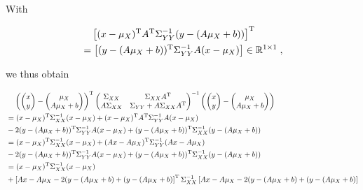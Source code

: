 \documentclass[a4paper,12pt]{article}
\begin{document}
With

\begin{equation} \label{eq:Sigma-yy-inv-equiv}
\begin{split}
&\hphantom{=}\; \left[ (x - \mu_X)^\mathrm{T} A^\mathrm{T} \Sigma_{YY}^{-1} (y - (A\mu_X + b)) \right]^\mathrm{T} \\
&= \left[ (y - (A\mu_X + b))^\mathrm{T} \Sigma_{YY}^{-1} A (x - \mu_X) \right] \in \mathbb{R}^{1 \times 1} \; ,
\end{split}
\end{equation}

we thus obtain

\begin{equation} \label{eq:mvn-joint-pdf-s3b}
\begin{split}
&\hphantom{=}\;
\left( \begin{pmatrix} x \\ y \end{pmatrix} - \begin{pmatrix} \mu_X \\ A\mu_X + b \end{pmatrix} \right)^\mathrm{T}
\begin{pmatrix}
\Sigma_{XX}   & \Sigma_{XX} A^\mathrm{T} \\
A \Sigma_{XX} & \Sigma_{YY} + A \Sigma_{XX} A^\mathrm{T}
\end{pmatrix}^{-1}
\left( \begin{pmatrix} x \\ y \end{pmatrix} - \begin{pmatrix} \mu_X \\ A\mu_X + b \end{pmatrix} \right) \\
&= (x - \mu_X)^\mathrm{T} \Sigma_{XX}^{-1} (x - \mu_X) + (x - \mu_X)^\mathrm{T} A^\mathrm{T} \Sigma_{YY}^{-1} A (x - \mu_X) \\
&- 2 (y - (A\mu_X + b))^\mathrm{T} \Sigma_{YY}^{-1} A (x - \mu_X) + (y - (A\mu_X + b))^\mathrm{T} \Sigma_{XX}^{-1} (y - (A\mu_X + b)) \\
&= (x - \mu_X)^\mathrm{T} \Sigma_{XX}^{-1} (x - \mu_X) + (Ax - A\mu_X)^\mathrm{T} \Sigma_{YY}^{-1} (Ax - A\mu_X) \\
&- 2 (y - (A\mu_X + b))^\mathrm{T} \Sigma_{YY}^{-1} A (x - \mu_X) + (y - (A\mu_X + b))^\mathrm{T} \Sigma_{XX}^{-1} (y - (A\mu_X + b)) \\
&= (x - \mu_X)^\mathrm{T} \Sigma_{XX}^{-1} (x - \mu_X) \\
&+ \left[ Ax - A\mu_X - 2(y - (A\mu_X + b) + (y - (A\mu_X + b) \right]^\mathrm{T} \Sigma_{XX}^{-1} \left[  Ax - A\mu_X - 2(y - (A\mu_X + b) + (y - (A\mu_X + b) \right] \\

\end{split}
\end{equation}
\end{document}
